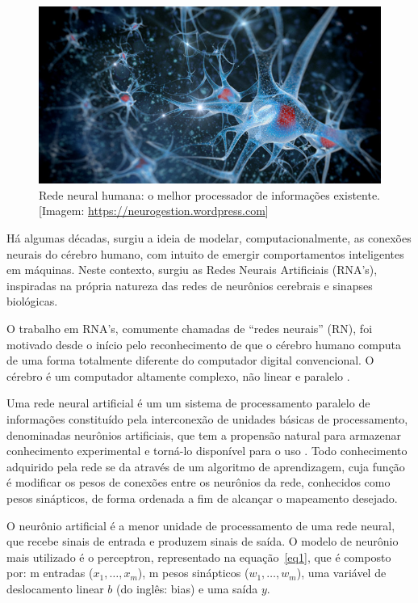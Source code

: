 \begin{figure}[ht]
\centering
\includegraphics[width=1\textwidth]{figuras/axons.jpg}
\caption{Rede neural humana: o melhor processador de informações existente. [Imagem: \href{ https://neurogestion.wordpress.com}{ https://neurogestion.wordpress.com}]}
\label{figneuronios}
\end{figure}

Há algumas décadas, surgiu a ideia de modelar, computacionalmente, as conexões neurais do cérebro humano, com intuito de emergir comportamentos inteligentes em máquinas. Neste contexto, surgiu as Redes Neurais Artificiais (RNA's), inspiradas na própria natureza das redes de neurônios cerebrais e sinapses biológicas.

O trabalho em RNA's, comumente chamadas de “redes neurais” (RN), foi motivado desde o início pelo reconhecimento de que o cérebro humano computa de uma forma totalmente diferente do computador digital convencional. O cérebro é um computador altamente complexo, não linear e paralelo \cite{haykin2009neural}.

Uma rede neural artificial é um um sistema de processamento paralelo de informações constituído pela interconexão de unidades básicas de processamento, denominadas neurônios artificiais, que tem a propensão natural para armazenar conhecimento experimental e torná-lo disponível para o uso \cite{haykin2009neural}. Todo conhecimento adquirido pela rede se da através de um algoritmo de aprendizagem, cuja função é modificar os pesos de conexões entre os neurônios da rede, conhecidos como pesos sinápticos, de forma ordenada a fim de alcançar o mapeamento desejado.

O neurônio artificial é a menor unidade de processamento de uma rede neural, que recebe sinais de entrada e produzem sinais de saída. O modelo de neurônio mais utilizado é o perceptron, representado na equação~\ref{eq1}, que é composto por: m entradas (\(x_1, \ldots ,x_m\)), m pesos sinápticos (\(w_1, \ldots , w_m\)), uma variável de deslocamento linear \(b\) (do inglês: bias) e uma saída \(y\).

